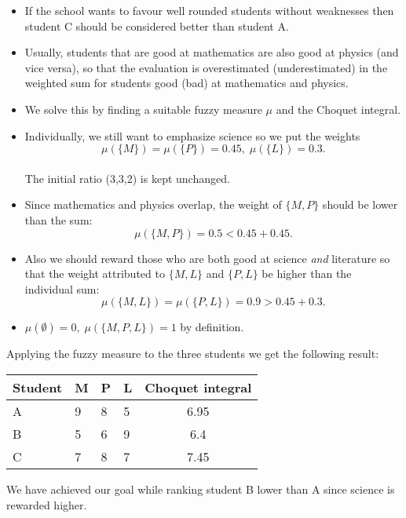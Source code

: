 \documentclass[envcountsect]{beamer}
\begin{document}
\begin{frame}
\begin{itemize}
\item If the school wants to favour well rounded students without weaknesses then student C should be considered better than student A. \\
\item Usually, students that are good at mathematics are also good at physics (and vice versa), so that the evaluation is overestimated (underestimated) in the weighted sum for students good (bad) at mathematics and physics. \\
\item We solve this by finding a suitable fuzzy measure $\mu$ and the Choquet integral.
\end{itemize}

\end{frame}

\begin{frame}
\begin{itemize}
\item Individually, we still want to emphasize science so we put the weights
$$\mu(\{M\}) = \mu(\{P\}) = 0.45, \; \mu(\{L\}) = 0.3.$$\\
The initial ratio (3,3,2) is kept unchanged.\\
\item Since mathematics and physics overlap, the weight of $\{M,P\}$ should be lower than the sum:
$$
\mu(\{M,P\}) = 0.5 < 0.45 + 0.45.
$$
\item Also we should reward those who are both good at science \emph{and} literature so that the weight attributed to $\{M,L\}$ and $\{P,L\}$ be higher than the individual sum:
$$
\mu(\{M,L\}) = \mu(\{P,L\}) = 0.9 > 0.45 + 0.3.
$$
\end{itemize}
\end{frame}
\begin{frame}
\begin{itemize}
\item $\mu(\emptyset) = 0, \; \mu(\{M,P,L\}) = 1$ by definition.
\end{itemize}
Applying the fuzzy measure to the three students we get the following result:
\begin{table}[]
\begin{tabular}{llllc}
\hline
Student  & M & P & L & Choquet integral \\
 \hline
 A & 9 & 8 & 5 &  6.95\\
 B & 5 & 6 & 9 &  6.4\\
 C & 7 & 8 & 7 &  7.45\\
 \hline
\end{tabular}
\end{table}
We have achieved our goal while ranking student B lower than A since science is rewarded higher.

\end{frame}
\end{document}
